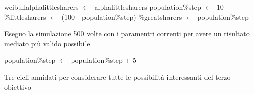 \vspace*{-10pt}
\begin{algorithm}
 \begin{algorithmic}[1]
      \State weibull\smuscore alpha\smuscore little\smuscore sharers  $\gets$ alpha\smuscore little\smuscore sharers
	\State population\smuscore \%\smuscore step $\gets$ 10
	  \State \%\smuscore little\smuscore sharers  $\gets$  (100 - population\smuscore \%\smuscore step)
	  \State \%\smuscore great\smuscore sharers  $\gets$  population\smuscore \%\smuscore step
	  
	  
	    \Comment Eseguo la simulazione 500 volte con i paramentri correnti per avere un risultato mediato più valido possibile
	  
	  \EndFor
	  
	  \State population\smuscore \%\smuscore step $\gets$ population\smuscore \%\smuscore step + 5
	  
	\EndWhile
      \EndFor
    \EndProcedure
 \end{algorithmic}
 
 \caption{Tre cicli annidati per considerare tutte le possibilità interessanti del terzo obiettivo}
 \label{alg:third_test}
\end{algorithm}
\vspace*{-15pt}

